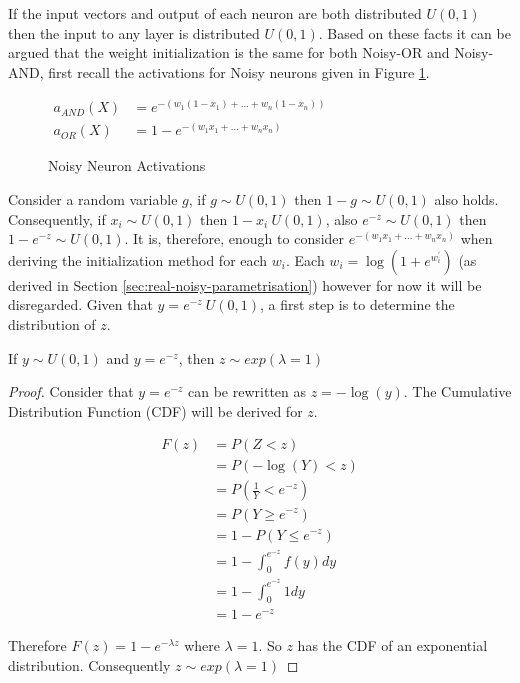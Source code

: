 \noindent
\begin{minipage}[t]{0.55\textwidth}
\vspace{0px}
If the input vectors and output of each neuron are both distributed $U(0,1)$ then the input to any layer is distributed $U(0,1)$. Based on these facts it can be argued that the weight initialization is the same for both Noisy-OR and Noisy-AND, first recall the activations for Noisy neurons given in Figure \ref{fig:recall-noisy-activations}.\\
\end{minipage}
\hspace{0.05\textwidth}
\begin{minipage}[t]{0.4\textwidth}
\vspace{0px}
\begin{figure}[H]
\vspace{0px}
{\centering
$ \displaystyle
\begin{aligned}
a_{AND}(X) &= e^{-(w_1(1 - x_1) + ... + w_n(1 - x_n))}\\
a_{OR}(X) &= 1 - e^{-(w_1x_1 + ... + w_nx_n)}
\end{aligned}
$
\par}
\caption{Noisy Neuron Activations}
\label{fig:recall-noisy-activations}
\end{figure}
\end{minipage}

Consider a random variable $g$, if $g \sim U(0,1)$ then $1 - g \sim U(0,1)$ also holds. Consequently, if $x_i \sim U(0,1)$ then $1 - x_i ~ U(0,1)$, also $e^{-z} \sim U(0,1)$ then $1 - e^{-z} \sim U(0,1)$. It is, therefore, enough to consider $e^{-(w_1x_1 + ... + w_nx_n)}$ when deriving the initialization method for each $w_i$. Each $w_i = \log(1 + e^{w^{'}_i})$ (as derived in Section \ref{sec:real-noisy-parametrisation}) however for now it will be disregarded. Given that $y = e^{-z} ~ U(0,1)$, a first step is to determine the distribution of $z$.\\
\begin{theorem}
	If $y \sim U(0,1)$ and $y = e^{-z}$, then $z \sim exp(\lambda = 1)$
\end{theorem}
\begin{proof}
	Consider that $y = e^{-z}$ can be rewritten as $z = -\log(y)$. The Cumulative Distribution Function (CDF) will be derived for $z$.
	
	\begin{align*}
	F(z) &= P(Z < z)\\
	&= P(-\log(Y) < z)\\
	&= P(\frac{1}{Y} < e^{-z})\\
	&= P(Y \geq e^{-z})\\
	&= 1 - P(Y \leq e^{-z})\\
	&= 1 - \int_{0}^{e^{-z}} f(y) dy\\
	&= 1 - \int_{0}^{e^{-z}} 1 dy\\
	&= 1 - e^{-z}
	\end{align*}
	
	Therefore $F(z) = 1 - e^{-\lambda z}$ where $\lambda = 1$. So $z$ has the CDF of an exponential distribution. Consequently $z \sim exp(\lambda = 1)$
\end{proof}

